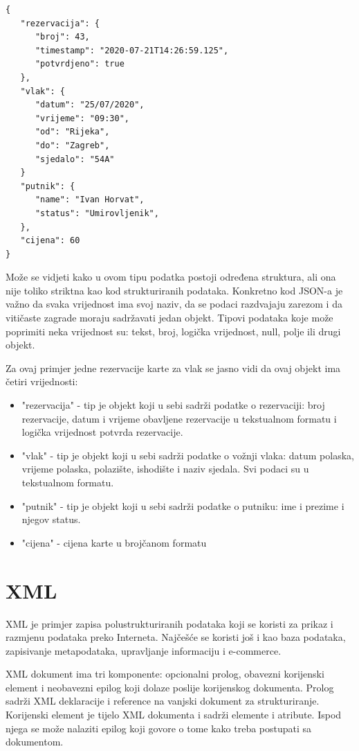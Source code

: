 \documentclass{foi}
\begin{document}
\begin{lstlisting}
{
   "rezervacija": {
      "broj": 43,
      "timestamp": "2020-07-21T14:26:59.125",
      "potvrdjeno": true
   },
   "vlak": {
      "datum": "25/07/2020",
      "vrijeme": "09:30",
      "od": "Rijeka",
      "do": "Zagreb",
      "sjedalo": "54A"
   }
   "putnik": {
      "name": "Ivan Horvat",
      "status": "Umirovljenik",
   },
   "cijena": 60
}
\end{lstlisting}

Može se vidjeti kako u ovom tipu podatka postoji određena struktura, ali ona nije toliko striktna kao kod strukturiranih podataka. Konkretno kod JSON-a je važno da svaka vrijednost ima svoj naziv, da se podaci razdvajaju zarezom i da vitičaste zagrade moraju sadržavati jedan objekt. Tipovi podataka koje može poprimiti neka vrijednost su: tekst, broj, logička vrijednost, null,  polje ili drugi objekt. 

Za ovaj primjer jedne rezervacije karte za vlak se jasno vidi da ovaj objekt ima četiri vrijednosti:

\begin{itemize}
\item "rezervacija" - tip je objekt koji u sebi sadrži podatke o rezervaciji: broj rezervacije, datum i vrijeme obavljene rezervacije u tekstualnom formatu i logička vrijednost potvrda rezervacije.
\item "vlak" - tip je objekt koji u sebi sadrži podatke o vožnji vlaka: datum polaska, vrijeme polaska, polazište, ishodište i naziv sjedala. Svi podaci su u tekstualnom formatu.
\item "putnik" - tip je objekt koji u sebi sadrži podatke o putniku: ime i prezime i njegov status.
\item "cijena" -  cijena karte u brojčanom formatu
\end{itemize}

\chapter{XML}

XML je primjer zapisa polustrukturiranih podataka koji se koristi za prikaz i razmjenu podataka preko Interneta. Najčešće se koristi još i kao baza podataka, zapisivanje metapodataka, upravljanje informaciju i e-commerce. 

XML dokument ima tri komponente: opcionalni prolog, obavezni korijenski element i neobavezni epilog koji dolaze poslije korijenskog dokumenta. Prolog sadrži XML deklaracije i reference na vanjski dokument za strukturiranje. Korijenski element je tijelo XML dokumenta i sadrži elemente i atribute. Ispod njega se može nalaziti epilog koji govore o tome kako treba postupati sa dokumentom. \cite{xmlDatabase}
\end{document}
